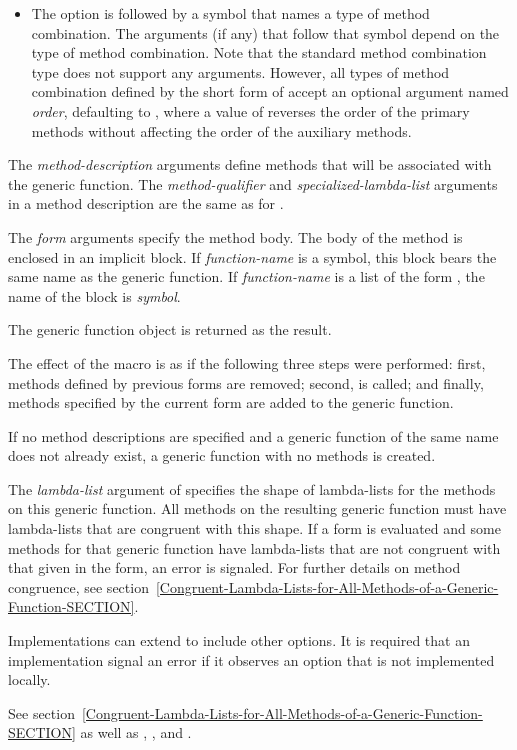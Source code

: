 \begin{defmac}
\begin{itemize}
\item  
The  option is followed by a symbol that
names a type of method combination.  The arguments (if any) that
follow that symbol depend on the type of method combination.  Note
that the standard method combination type does not support any
arguments.  However, all types of method combination defined by the
short form of  accept an optional
argument named \emph{order}, defaulting to 
, where a value of  reverses
the order of the primary methods without affecting the order of the
auxiliary methods.
\end{itemize}

The \emph{method-description} arguments define methods that will
be associated with the generic function.  The \emph{method-qualifier}
and \emph{specialized-lambda-list} arguments in a method description
are the same as for .

The \emph{form} arguments specify the method body.  The body of the
method is enclosed in an implicit block.  If \emph{function-name} is a symbol,
this block bears the same name as 
the generic function.  If \emph{function-name} is a list of the
form , the name of the block is \emph{symbol}.

The generic function object is returned as the result. 

The effect of the  macro is as if the following three
steps were performed: first, methods defined by previous 
 forms are removed; second, 
is called; and finally, methods specified by the current 
 form are added to the generic function. 

If no method descriptions are specified and a generic function of the same
name does not already exist, a generic function with no methods is created.

The \emph{lambda-list} argument of 
 specifies the shape of lambda-lists for the methods on
this generic function.  All methods on the resulting generic function must have
lambda-lists that are congruent with this shape.  If a 
 form is evaluated and some methods for that generic
function have lambda-lists that are not congruent with that given in
the  form, an error is signaled.  For further details
on method congruence,
see
section~\ref{Congruent-Lambda-Lists-for-All-Methods-of-a-Generic-Function-SECTION}.

Implementations can extend  to include other options.
It is required that an implementation signal an error if
it observes an option that is not implemented locally.

See section~\ref{Congruent-Lambda-Lists-for-All-Methods-of-a-Generic-Function-SECTION}
as well as , , and
.
\end{defmac}

